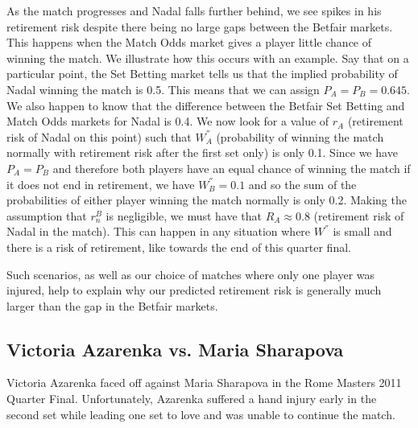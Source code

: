 \documentclass[letterpaper,12pt]{article}
\begin{document}
As the match progresses and Nadal falls further behind, we see spikes in his retirement risk despite there being no large gaps between the Betfair markets.  This happens when the Match Odds market gives a player little chance of winning the match.  We illustrate how this occurs with an example.  Say that on a particular point, the Set Betting market tells us that the implied probability of Nadal winning the match is 0.5.  This means that we can assign $P_A = P_B = 0.645$.  We also happen to know that the difference between the Betfair Set Betting and Match Odds markets for Nadal is 0.4.  We now look for a value of $r_A$ (retirement risk of Nadal on this point) such that $W_A^{''}$ (probability of winning the match normally with retirement risk after the first set only) is only 0.1.  Since we have $P_A = P_B$ and therefore both players have an equal chance of winning the match if it does not end in retirement, we have $W_B^{''} = 0.1$ and so the sum of the probabilities of either player winning the match normally is only 0.2.  Making the assumption that $r_n^B$ is negligible, we must have that $R_A \approx 0.8$ (retirement risk of Nadal in the match).  This can happen in any situation where $W^{''}$ is small and there is a risk of retirement, like towards the end of this quarter final.

Such scenarios, as well as our choice of matches where only one player was injured, help to explain why our predicted retirement risk is generally much larger than the gap in the Betfair markets.

\subsection{Victoria Azarenka vs. Maria Sharapova}

Victoria Azarenka faced off against Maria Sharapova in the Rome Masters 2011 Quarter Final.  Unfortunately, Azarenka suffered a hand injury early in the second set while leading one set to love and was unable to continue the match.
\end{document}
